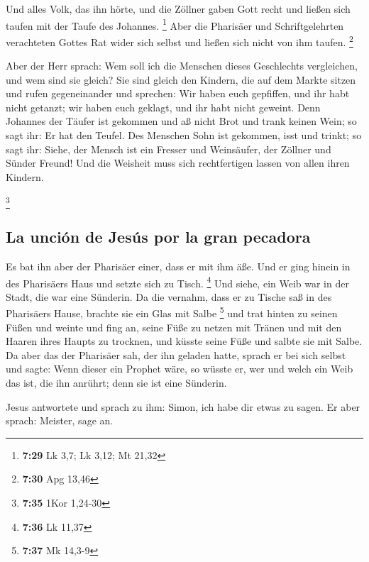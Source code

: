  Und alles Volk, das ihn hörte, und die Zöllner gaben
Gott recht und ließen sich taufen mit der Taufe des Johannes.
\footnote{\textbf{7:29} Lk 3,7; Lk 3,12; Mt 21,32}  Aber
die Pharisäer und Schriftgelehrten verachteten Gottes Rat wider sich
selbst und ließen sich nicht von ihm taufen. \footnote{\textbf{7:30} Apg
  13,46}

 Aber der Herr sprach: Wem soll ich die Menschen dieses
Geschlechts vergleichen, und wem sind sie gleich?  Sie
sind gleich den Kindern, die auf dem Markte sitzen und rufen
gegeneinander und sprechen: Wir haben euch gepfiffen, und ihr habt nicht
getanzt; wir haben euch geklagt, und ihr habt nicht geweint.
 Denn Johannes der Täufer ist gekommen und aß nicht Brot
und trank keinen Wein; so sagt ihr: Er hat den Teufel. 
Des Menschen Sohn ist gekommen, isst und trinkt; so sagt ihr: Siehe, der
Mensch ist ein Fresser und Weinsäufer, der Zöllner und Sünder Freund!
 Und die Weisheit muss sich rechtfertigen lassen von
allen ihren Kindern.

\footnote{\textbf{7:35} 1Kor 1,24-30}

\hypertarget{la-unciuxf3n-de-jesuxfas-por-la-gran-pecadora}{%
\subsection{La unción de Jesús por la gran
pecadora}\label{la-unciuxf3n-de-jesuxfas-por-la-gran-pecadora}}

 Es bat ihn aber der Pharisäer einer, dass er mit ihm
äße. Und er ging hinein in des Pharisäers Haus und setzte sich zu Tisch.
\footnote{\textbf{7:36} Lk 11,37}  Und siehe, ein Weib
war in der Stadt, die war eine Sünderin. Da die vernahm, dass er zu
Tische saß in des Pharisäers Hause, brachte sie ein Glas mit Salbe
\footnote{\textbf{7:37} Mk 14,3-9}  und trat hinten zu
seinen Füßen und weinte und fing an, seine Füße zu netzen mit Tränen und
mit den Haaren ihres Haupts zu trocknen, und küsste seine Füße und
salbte sie mit Salbe.  Da aber das der Pharisäer sah, der
ihn geladen hatte, sprach er bei sich selbst und sagte: Wenn dieser ein
Prophet wäre, so wüsste er, wer und welch ein Weib das ist, die ihn
anrührt; denn sie ist eine Sünderin.

 Jesus antwortete und sprach zu ihm: Simon, ich habe dir
etwas zu sagen. Er aber sprach: Meister, sage an.

